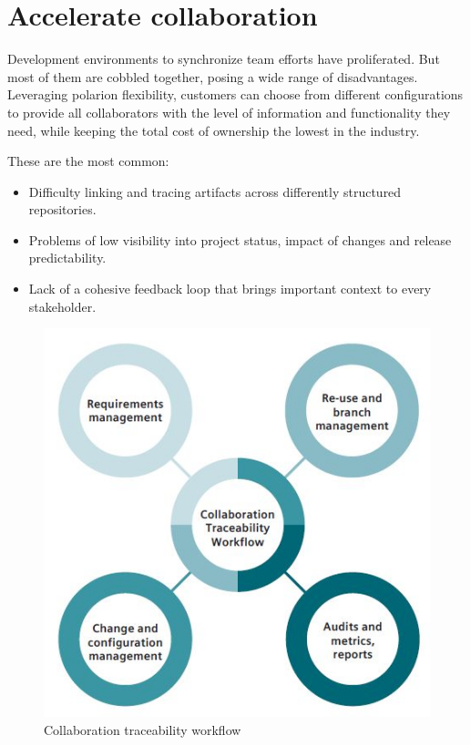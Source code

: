 \documentclass[thesis=M,english]{FITthesis}[2012/06/26]
\begin{document}
\section{Accelerate collaboration}

Development environments to synchronize team efforts have proliferated. But most of them are cobbled together, posing a wide range of disadvantages. Leveraging \acrshort{polarion} flexibility, customers can choose from different configurations to provide all collaborators with the level of information and functionality they need, while keeping the total cost of ownership the lowest in the industry.

These are the most common:
\begin{itemize}[nosep]
	\item Difficulty linking and tracing artifacts across differently
	structured repositories.
	\item Problems of low visibility into project status, impact of
	changes and release predictability.
	\item Lack of a cohesive feedback loop that brings important
	context to every stakeholder.
\end{itemize}

\begin{figure}[h!]\centering
	\includegraphics[width=1\textwidth]{pictures/collaboration_workflow}
	\caption{Collaboration traceability workflow \cite{polarion_alm}}\label{fig:collaboration_workflow}
\end{figure}
\end{document}
